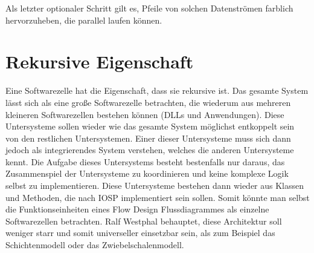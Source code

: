 Als letzter optionaler Schritt gilt es, Pfeile von solchen Datenströmen farblich hervorzuheben, die
parallel laufen können.

\section{Rekursive Eigenschaft}

Eine Softwarezelle hat die Eigenschaft, dass sie rekursive ist.
Das gesamte System lässt sich als eine große Softwarezelle betrachten, die wiederum
aus mehreren kleineren Softwarezellen bestehen können (DLLs und Anwendungen).
Diese Untersysteme sollen wieder wie das gesamte System möglichst entkoppelt
sein von den restlichen Untersystemen. Einer dieser Untersysteme muss sich dann
jedoch als integrierendes System verstehen, welches die anderen Untersysteme
kennt. Die Aufgabe dieses Untersystems besteht bestenfalls nur daraus, das
Zusammenspiel der Untersysteme zu koordinieren und keine komplexe Logik selbst zu implementieren.
Diese Untersysteme bestehen dann wieder aus Klassen und Methoden, die nach IOSP
implementiert sein sollen.
Somit könnte man selbst die Funktionseinheiten eines Flow Design
Flussdiagrammes als einzelne Softwarezellen betrachten.
Ralf Westphal behauptet, diese Architektur soll weniger starr und somit
universeller einsetzbar sein, als zum Beispiel das Schichtenmodell oder das Zwiebelschalenmodell.
